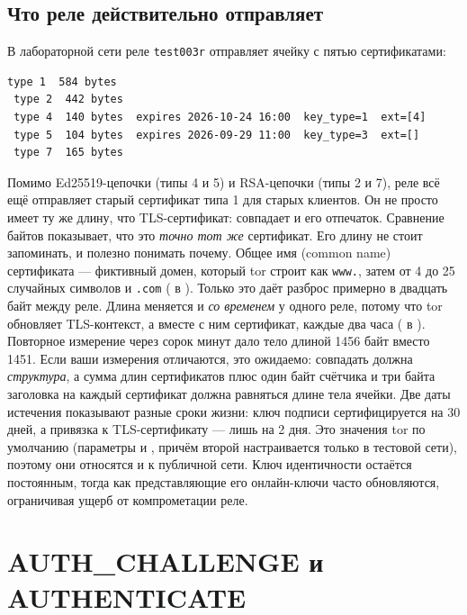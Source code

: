 \subsection{Что реле действительно отправляет}

В лабораторной сети реле \texttt{test003r} отправляет ячейку  с пятью сертификатами:
\begin{lstlisting}[numbers=none]
 type 1  584 bytes
 type 2  442 bytes
 type 4  140 bytes  expires 2026-10-24 16:00  key_type=1  ext=[4]
 type 5  104 bytes  expires 2026-09-29 11:00  key_type=3  ext=[]
 type 7  165 bytes
\end{lstlisting}
Помимо Ed25519-цепочки (типы 4 и 5) и RSA-цепочки (типы 2 и 7), реле всё ещё отправляет старый сертификат типа 1 для старых клиентов. Он не просто имеет ту же длину, что TLS-сертификат: совпадает и его отпечаток. Сравнение байтов показывает, что это \emph{точно тот же} сертификат. Его длину не стоит запоминать, и полезно понимать почему. Общее имя (common name) сертификата --- фиктивный домен, который tor строит как \texttt{www.}, затем от 4 до 25 случайных символов и \texttt{.com} ( в ). Только это даёт разброс примерно в двадцать байт между реле. Длина меняется и \emph{со временем} у одного реле, потому что tor обновляет TLS-контекст, а вместе с ним сертификат, каждые два часа ( в ). Повторное измерение через сорок минут дало тело  длиной 1456 байт вместо 1451. Если ваши измерения отличаются, это ожидаемо: совпадать должна \emph{структура}, а сумма длин сертификатов плюс один байт счётчика и три байта заголовка на каждый сертификат должна равняться длине тела ячейки. Две даты истечения показывают разные сроки жизни: ключ подписи сертифицируется на 30 дней, а привязка к TLS-сертификату --- лишь на 2 дня. Это значения tor по умолчанию (параметры  и , причём второй настраивается только в тестовой сети), поэтому они относятся и к публичной сети. Ключ идентичности остаётся постоянным, тогда как представляющие его онлайн-ключи часто обновляются, ограничивая ущерб от компрометации реле.

\section{AUTH\_CHALLENGE и AUTHENTICATE}\label{sec:canale-authenticate}

